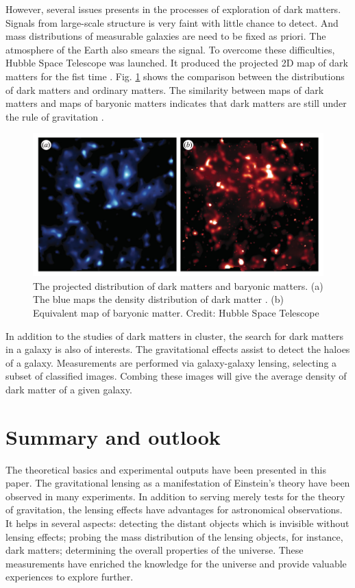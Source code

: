 \documentclass[letter,12pt]{article}
\begin{document}
However, several issues presents in the processes of exploration of
dark matters. Signals from large-scale structure is very faint with
little chance to detect. And mass distributions of measurable
galaxies are need to be fixed as priori. The atmosphere of the Earth
also smears the signal. To overcome these difficulties, Hubble Space
Telescope was launched. It produced the projected 2D map of dark
matters for the fist time \citep{Massey2007}. Fig. \ref{fig:orgce62878}
shows the comparison between the distributions of dark matters and
ordinary matters. The similarity between maps of dark matters and
maps of baryonic matters indicates that dark matters are still under
the rule of gravitation \citep{Ellis2010darkmatter}.

\begin{figure}[htbp]
\centering
\includegraphics[width=.9\linewidth]{./figures/dark_matter.png}
\caption{\label{fig:orgce62878}The projected distribution of dark matters and baryonic matters. (a) The blue maps the density distribution of dark matter \citep{Massey2007}. (b) Equivalent map of baryonic matter. Credit: Hubble Space Telescope}
\end{figure}

In addition to the studies of dark matters in cluster, the search
for dark matters in a galaxy is also of interests. The gravitational
effects assist to detect the haloes of a galaxy. Measurements are
performed via galaxy-galaxy lensing, selecting a subset of
classified images. Combing these images will give the average
density of dark matter of a given galaxy.

\section{Summary and outlook}
\label{sec:orgc0728c7}
\label{orgb7fedea} The theoretical basics and experimental outputs have
been presented in this paper. The gravitational lensing as a
manifestation of Einstein's theory have been observed in many
experiments. In addition to serving merely tests for the theory of
gravitation, the lensing effects have advantages for astronomical
observations. It helps in several aspects: detecting the distant
objects which is invisible without lensing effects; probing the mass
distribution of the lensing objects, for instance, dark matters;
determining the overall properties of the universe. These
measurements have enriched the knowledge for the universe and
provide valuable experiences to explore further.
\end{document}
